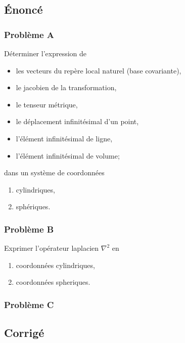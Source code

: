 \documentclass
[
a4paper,                      %
twoside,					  %
12pt,                         %
abstract,		      %
fleqn,                        %
]
{scrartcl} %
\begin{document}
\subsection{\'Enonc\'e}

\subsubsection{Probl\`eme A}

D\'eterminer l'expression de

\begin{itemize}
\renewcommand\labelitemi{--}
\item les vecteurs du rep\`ere local naturel (base covariante),
\item le jacobien de la transformation,
\item le tenseur m\'etrique,
\item le d\'eplacement infinit\'esimal d'un point,
\item l'\'el\'ement infinit\'esimal de ligne,
\item l'\'el\'ement infinit\'esimal de volume;
\end{itemize}

dans un syst\`eme de coordonn\'ees

\begin{enumerate}
\item cylindriques,
\item sph\'eriques.
\end{enumerate}

\subsubsection{Probl\`eme B}

Exprimer l'op\'erateur laplacien $\nabla^{2}$ en

\begin{enumerate}
\item coordonn\'ees cylindriques,
\item coordonn\'ees spheriques.
\end{enumerate}

\subsubsection{Probl\`eme C}

\newpage

\subsection{Corrig\'e}
\end{document}
